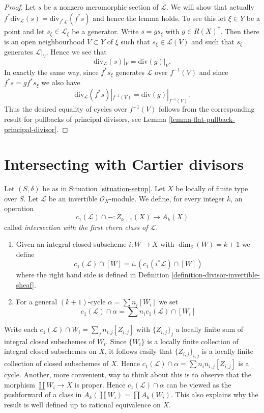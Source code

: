 \begin{proof}
Let $s$ be a nonzero meromorphic section of $\mathcal{L}$.
We will show that actually
$f^*\text{div}_\mathcal{L}(s) = \text{div}_{f^*\mathcal{L}}(f^*s)$
and hence the lemma holds.
To see this let $\xi \in Y$ be a point and let $s_\xi \in \mathcal{L}_\xi$
be a generator. Write $s = gs_\xi$ with $g \in R(X)^*$.
Then there is an open neighbourhood $V \subset Y$ of $\xi$
such that $s_\xi \in \mathcal{L}(V)$ and such that $s_\xi$ generates
$\mathcal{L}|_V$. Hence we see that
$$
\text{div}_\mathcal{L}(s)|_V = \text{div}(g)|_V.
$$
In exactly the same way, since $f^*s_\xi$ generates $\mathcal{L}$
over $f^{-1}(V)$ and since $f^*s = g f^*s_\xi$ we also
have
$$
\text{div}_\mathcal{L}(f^*s)|_{f^{-1}(V)}
=
\text{div}(g)|_{f^{-1}(V)}.
$$
Thus the desired equality of cycles over $f^{-1}(V)$ follows from the
corresponding result for pullbacks of principal divisors, see
Lemma \ref{lemma-flat-pullback-principal-divisor}.
\end{proof}



\section{Intersecting with Cartier divisors}
\label{section-intersecting-with-divisors}

\begin{definition}
\label{definition-cap-c1}
Let $(S, \delta)$ be as in Situation \ref{situation-setup}.
Let $X$ be locally of finite type over $S$.
Let $\mathcal{L}$ be an invertible $\mathcal{O}_X$-module.
We define, for every integer $k$, an operation
$$
c_1(\mathcal{L}) \cap - :
Z_{k + 1}(X) \to A_k(X)
$$
called {\it intersection with the first chern class of $\mathcal{L}$}.
\begin{enumerate}
\item Given an integral closed subscheme $i : W \to X$ with
$\dim_\delta(W) = k + 1$ we define
$$
c_1(\mathcal{L}) \cap [W] = i_*(c_1({i^*\mathcal{L}}) \cap [W])
$$
where the right hand side is defined in
Definition \ref{definition-divisor-invertible-sheaf}.
\item For a general $(k + 1)$-cycle $\alpha = \sum n_i [W_i]$ we set
$$
c_1(\mathcal{L}) \cap \alpha = \sum n_i c_1(\mathcal{L}) \cap [W_i]
$$
\end{enumerate}
\end{definition}

\noindent
Write each $c_1(\mathcal{L}) \cap W_i = \sum_j n_{i, j} [Z_{i, j}]$
with $\{Z_{i, j}\}_j$ a locally finite sum
of integral closed subschemes of $W_i$. Since $\{W_i\}$ is a locally
finite collection of integral closed subschemes on $X$, it follows
easily that $\{Z_{i, j}\}_{i, j}$ is a locally finite collection
of closed subschemes of $X$. Hence
$c_1(\mathcal{L}) \cap \alpha = \sum n_in_{i, j}[Z_{i, j}]$
is a cycle. Another, more convenient, way to think about this
is to observe that the morphism $\coprod W_i \to X$ is
proper. Hence $c_1(\mathcal{L}) \cap \alpha$ can be viewed
as the pushforward of a class in $A_k(\coprod W_i) = \prod A_k(W_i)$.
This also explains why the result is well defined up to rational
equivalence on $X$.

